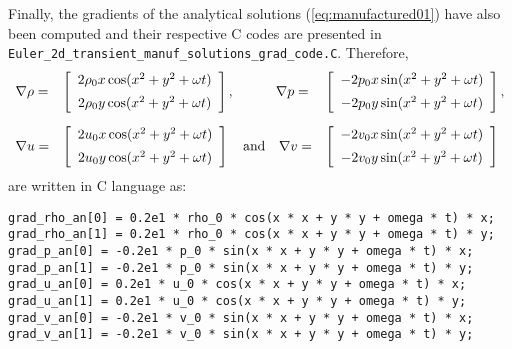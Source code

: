 \documentclass[10pt]{article}
\begin{document}
Finally, the gradients of the analytical solutions (\ref{eq:manufactured01}) have also been computed and their respective C codes are presented in  \texttt{Euler\_2d\_transient\_manuf\_solutions\_grad\_code.C}. Therefore,
\begin{equation}
\begin{array}{lll}
\nabla \rho =& \left[ \begin{array}{c}
 2  \rho_0 x \cos(x^2 + y^2 +\omega  t)  \vspace{5pt}\\
 2  \rho_0 y \cos(x^2 + y^2 + \omega  t) 
\end{array} \right],
\quad\qquad
\nabla p =& \left[ \begin{array}{c}
-2  p_0 x \sin(x^2 + y^2 + \omega  t)   \vspace{5pt}\\
 -2  p_0 y \sin(x^2 + y^2 + \omega  t) 
\end{array} \right], \vspace{10pt} \\
%
\nabla u =& \left[ \begin{array}{c}
 2  u_0 x \cos(x^2 + y^2 + \omega  t)  \vspace{5pt} \\
 2  u_0 y \cos(x^2 + y^2 + \omega  t) 
\end{array} \right]
\quad \mbox{and} \quad
\nabla v =& \left[ \begin{array}{c}
-2  v_0 x \sin(x^2 + y^2 + \omega  t) \vspace{5pt} \\
-2  v_0 y \sin(x^2 + y^2 + \omega  t)  
\end{array} \right]
\end{array}
\end{equation}
are written in C language as:
\begin{verbatim}
grad_rho_an[0] = 0.2e1 * rho_0 * cos(x * x + y * y + omega * t) * x;
grad_rho_an[1] = 0.2e1 * rho_0 * cos(x * x + y * y + omega * t) * y;
grad_p_an[0] = -0.2e1 * p_0 * sin(x * x + y * y + omega * t) * x;
grad_p_an[1] = -0.2e1 * p_0 * sin(x * x + y * y + omega * t) * y;
grad_u_an[0] = 0.2e1 * u_0 * cos(x * x + y * y + omega * t) * x;
grad_u_an[1] = 0.2e1 * u_0 * cos(x * x + y * y + omega * t) * y;
grad_v_an[0] = -0.2e1 * v_0 * sin(x * x + y * y + omega * t) * x;
grad_v_an[1] = -0.2e1 * v_0 * sin(x * x + y * y + omega * t) * y;
\end{verbatim}



 

\end{document}

